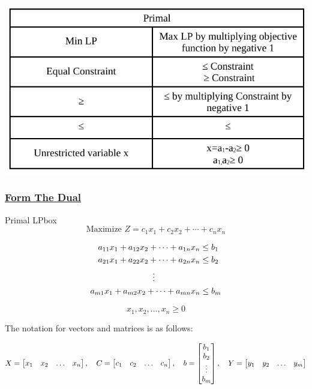 \vspace{0.35cm}
\begin{center}
    \includegraphics{Chapters/Dual/maxForm.pdf}
\end{center}


\subsubsection*{\underline{Form The Dual}}
\begin{prettyBox}{Primal LP}{box}
 \[
    \text{Maximize } Z = c_1x_1 + c_2x_2 + \cdots + c_nx_n
\]

\vspace{0.25cm}
\hspace{1cm}
\[
\begin{aligned}
    a_{11}x_1 + a_{12}x_2 + \cdots + a_{1n}x_n &\leq b_1 \\
    a_{21}x_1 + a_{22}x_2 + \cdots + a_{2n}x_n &\leq b_2 \\
    &\hspace{-2cm}\vdots \\
    a_{m1}x_1 + a_{m2}x_2 + \cdots + a_{mn}x_n &\leq b_m
\end{aligned}
\]

\[
    x_1, x_2, \dots, x_n \geq 0  
\]
 
\end{prettyBox}

\vspace{1cm}

The notation for vectors and matrices is as follows:

\[
X = \left[\begin{matrix} x_1 & x_2 & \dots & x_n \end{matrix}\right], \hspace{0.35cm}
C = \left[\begin{matrix} c_1 & c_2 & \dots & c_n \end{matrix}\right], \hspace{0.35cm}
b = \left[\begin{matrix} b_1 \\ b_2 \\ \vdots \\ b_m \end{matrix}\right], \hspace{0.35cm}
Y = \left[\begin{matrix} y_1 & y_2 & \dots & y_m \end{matrix}\right]
\]

